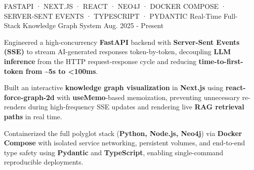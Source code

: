 

\begin{cventries}


  \cventry
  {FASTAPI · NEXT.JS · REACT · NEO4J · DOCKER COMPOSE · SERVER-SENT EVENTS · TYPESCRIPT · PYDANTIC} %
  {Real-Time Full-Stack Knowledge Graph System} %
  {} %
  {Aug. 2025 - Present} %
  {
    \begin{cvitems}
      \item {Engineered a high-concurrency \textbf{FastAPI} backend with \textbf{Server-Sent Events (SSE)} to stream AI-generated responses token-by-token, decoupling \textbf{LLM inference} from the HTTP request-response cycle and reducing \textbf{time-to-first-token from \~{}5s to <100ms}.}
      \item {Built an interactive \textbf{knowledge graph visualization} in \textbf{Next.js} using \textbf{react-force-graph-2d} with \textbf{useMemo}-based memoization, preventing unnecessary re-renders during high-frequency SSE updates and rendering live \textbf{RAG retrieval paths} in real time.}
      \item {Containerized the full polyglot stack (\textbf{Python, Node.js, Neo4j}) via \textbf{Docker Compose} with isolated service networking, persistent volumes, and end-to-end type safety using \textbf{Pydantic} and \textbf{TypeScript}, enabling single-command reproducible deployments.}
    \end{cvitems}
  }


\end{cventries}
